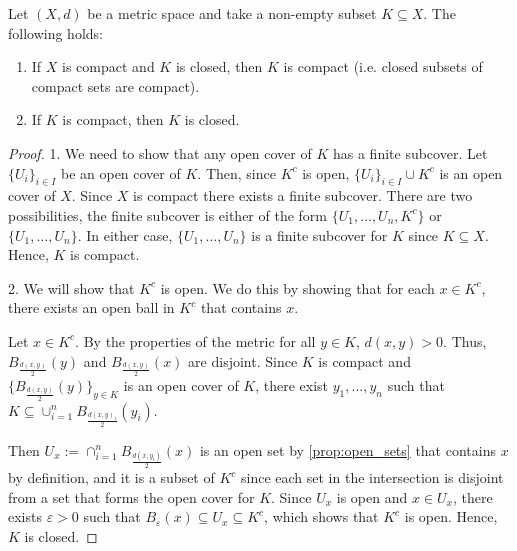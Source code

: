\documentclass{article}
\begin{document}
\begin{proposition}Let $(X,d)$ be a metric space and take a non-empty subset $K\subseteq X$. The following holds:
\begin{enumerate}
    \item If $X$ is compact and $K$ is closed, then $K$ is compact (i.e. closed subsets of compact sets are compact).
    \item If $K$ is compact, then $K$ is closed.
\end{enumerate}
\end{proposition}
\begin{proof}
1. We need to show that any open cover of $K$ has a finite subcover. Let $\{U_i\}_{i\in I}$ be an open cover of $K$. Then, since $K^c$ is open, $\{U_i\}_{i\in I} \cup {K^c}$ is an open cover of $X$. Since $X$ is compact there exists a finite subcover. There are two possibilities,  the finite subcover is either of the form $\{U_1, \ldots, U_n, K^c\}$ or $\{U_1, \ldots, U_n\}$. In either case, $\{U_1, \ldots, U_n\}$ is a finite subcover for $K$ since $K \subseteq X$. Hence, $K$ is compact. 
    
2. We will show that $K^c$ is open. We do this by showing that for each $x\in K^c$, there exists an open ball in $K^c$ that contains $x$.

Let $x\in K^c$. By the properties of the metric for all $y\in K$, $d(x,y)>0$. Thus, $B_\frac{d(x,y)}{2}(y)$ and $B_\frac{d(x,y)}{2}(x)$ are disjoint.  Since $K$ is compact and $\{B_\frac{d(x,y)}{2}(y)\}_{y\in K}$ is an open cover of $K$, there exist $y_1,\ldots, y_n$ such that $K\subseteq \cup_{i=1}^n B_\frac{d(x,y)_i}{2}(y_i)$.

Then $U_x := \cap_{i=1}^n B_\frac{d(x,y_i)}{2}(x)$ is an open set by \cref{prop:open_sets} that contains $x$ by definition, and it is a subset of $K^c$ since each set in the intersection is disjoint from a set that forms the open cover for $K$. Since $U_x$ is open and $x\in U_x$, there exists $\varepsilon>0$ such that $B_\varepsilon(x) \subseteq U_x\subseteq K^c$, which shows that $K^c$ is open. Hence, $K$ is closed.
\end{proof}
\end{document}
